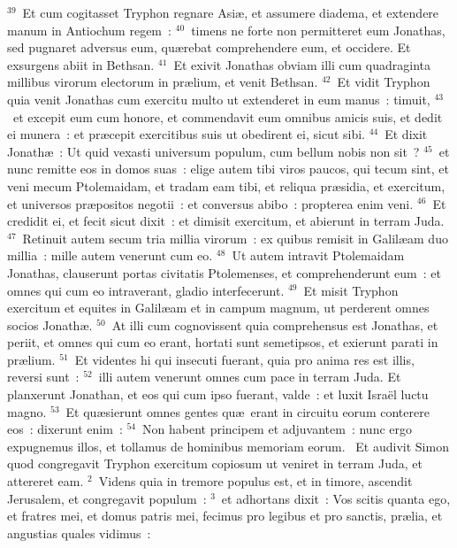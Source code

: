 ${}^{39}$~Et cum cogitasset Tryphon regnare Asi\ae , et assumere diadema, et extendere manum in Antiochum regem~:
${}^{40}$~timens ne forte non permitteret eum Jonathas, sed pugnaret adversus eum, qu\ae rebat comprehendere eum, et occidere. Et exsurgens abiit in Bethsan.
${}^{41}$~Et exivit Jonathas obviam illi cum quadraginta millibus virorum electorum in pr\ae lium, et venit Bethsan.
${}^{42}$~Et vidit Tryphon quia venit Jonathas cum exercitu multo ut extenderet in eum manus~: timuit,
${}^{43}$~et excepit eum cum honore, et commendavit eum omnibus amicis suis, et dedit ei munera~: et pr\ae cepit exercitibus suis ut obedirent ei, sicut sibi.
${}^{44}$~Et dixit Jonath\ae~: Ut quid vexasti universum populum, cum bellum nobis non sit~?
${}^{45}$~et nunc remitte eos in domos suas~: elige autem tibi viros paucos, qui tecum sint, et veni mecum Ptolemaidam, et tradam eam tibi, et reliqua pr\ae sidia, et exercitum, et universos pr\ae positos negotii~: et conversus abibo~: propterea enim veni.
${}^{46}$~Et credidit ei, et fecit sicut dixit~: et dimisit exercitum, et abierunt in terram Juda.
${}^{47}$~Retinuit autem secum tria millia virorum~: ex quibus remisit in Galil\ae am duo millia~: mille autem venerunt cum eo.
${}^{48}$~Ut autem intravit Ptolemaidam Jonathas, clauserunt portas civitatis Ptolemenses, et comprehenderunt eum~: et omnes qui cum eo intraverant, gladio interfecerunt.
${}^{49}$~Et misit Tryphon exercitum et equites in Galil\ae am et in campum magnum, ut perderent omnes socios Jonath\ae .
${}^{50}$~At illi cum cognovissent quia comprehensus est Jonathas, et periit, et omnes qui cum eo erant, hortati sunt semetipsos, et exierunt parati in pr\ae lium.
${}^{51}$~Et videntes hi qui insecuti fuerant, quia pro anima res est illis, reversi sunt~:
${}^{52}$~illi autem venerunt omnes cum pace in terram Juda. Et planxerunt Jonathan, et eos qui cum ipso fuerant, valde~: et luxit Isra\"el luctu magno.
${}^{53}$~Et qu\ae sierunt omnes gentes qu\ae\ erant in circuitu eorum conterere eos~: dixerunt enim~:
${}^{54}$~Non habent principem et adjuvantem~: nunc ergo expugnemus illos, et tollamus de hominibus memoriam eorum.
~\lettrine[lines=10,image=true,loversize=0.05,lraise=-0.03]{E}{}t audivit Simon quod congregavit Tryphon exercitum copiosum ut veniret in terram Juda, et attereret eam.
${}^{2}$~Videns quia in tremore populus est, et in timore, ascendit Jerusalem, et congregavit populum~:
${}^{3}$~et adhortans dixit~: Vos scitis quanta ego, et fratres mei, et domus patris mei, fecimus pro legibus et pro sanctis, pr\ae lia, et angustias quales vidimus~:
